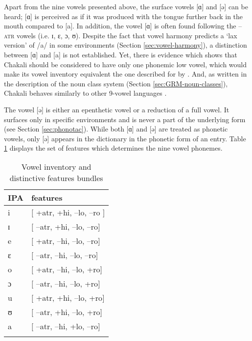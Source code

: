 Apart from the nine vowels presented above, the surface vowels  [{ɑ}] and 
[{ə}] can be heard;  [{ɑ}] is perceived as 
if it was produced with the tongue further back in the mouth compared to [{a}]. In 
addition, the vowel [{ɑ}]  is often found  following the \textsc{--atr} vowels (i.e. {ɪ, ɛ, ɔ, ʊ}). Despite the fact that vowel harmony predicts a `lax version'  of /{a}/ in 
some environments (Section \ref{sec:vowel-harmony}),  a 
distinction between [{ɑ}] and  [{a}] is not established. Yet, 
there is  evidence which shows that Chakali should be considered to have only 
one phonemic low vowel, which would make its vowel inventory equivalent the one 
described for   by \citet{Toup95}.  And, as  written in the 
description of the  noun class system (Section \ref{sec:GRM-noun-classes}),  Chakali behaves similarly to other 9-vowel  languages 
\citep[see][41]{Casa03a}.


The vowel [{ə}] is either an epenthetic vowel or a reduction of a full 
vowel. It surfaces only in specific environments and is never a part of the 
underlying form (see  Section \ref{sec:phonotac}). While both   
[{ɑ}] and   [{ə}] are treated as phonetic vowels, only  
[{ə}]  appears in the dictionary in the phonetic form of an entry. Table 
\ref{tab:featspec} displays the set of features which determines the nine vowel 
phonemes. 


\begin{table}
 \caption{Vowel inventory and distinctive features bundles}
  \label{tab:featspec}
  \begin{tabular}{ll}
\lsptoprule
IPA  & features   \\[1ex] \midrule 

{i} & $[$ {\sc +atr}, {\sc +hi}, {\sc --lo},  {\sc --ro} $]$\\
{ɪ} & $[$ {\sc --atr},  {\sc +hi}, {\sc --lo}, {\sc --ro}$]$\\
{e} & $[$  {\sc +atr},  {\sc --hi}, {\sc --lo},  {\sc --ro}$]$\\
{ɛ} & $[$  {\sc --atr},  {\sc --hi},  {\sc --lo},  {\sc --ro}$]$\\
{o} & $[$  {\sc +atr},  {\sc --hi},  {\sc --lo},  {\sc +ro}$]$\\
{ɔ} & $[$  {\sc --atr},  {\sc --hi}, {\sc --lo}, {\sc +ro}$]$\\
{u} & $[$  {\sc +atr},  {\sc +hi},  {\sc --lo},  {\sc +ro}$]$ \\
{ʊ} & $[$  {\sc --atr},  {\sc +hi},  {\sc --lo},  {\sc +ro}$]$\\
{a} &  $[$  {\sc --atr}, {\sc --hi},  {\sc +lo}, {\sc --ro}$]$\\

\lspbottomrule 


  \end{tabular}
 
\end{table}

